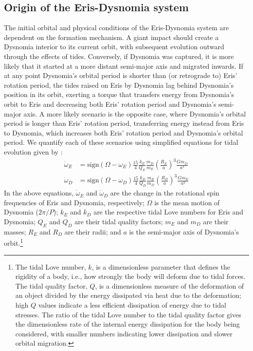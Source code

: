 \documentclass[onecolumn]{aastex631}
\begin{document}
\subsection{Origin of the Eris-Dysnomia system}
The initial orbital and physical conditions of the Eris-Dysnomia system are dependent on the formation mechanism. A giant impact should create a Dysnomia interior to its current orbit, with subsequent evolution outward through the effects of tides. Conversely, if Dysnomia was captured, it is more likely that it started at a more distant semi-major axis and migrated inwards. If at any point Dysnomia's orbital period is shorter than (or retrograde to) Eris' rotation period, the tides raised on Eris by Dysnomia lag behind Dysnomia's position in its orbit, exerting a torque that transfers energy from Dysnomia's orbit to Eris and decreasing both Eris' rotation period and Dysnomia's semi-major axis. A more likely scenario is the opposite case, where Dysnomia's orbital period is longer than Eris' rotation period, transferring energy instead from Eris to Dysnomia, which increases both Eris' rotation period and Dysnomia's orbital period.  We quantify each of these scenarios using simplified equations for tidal evolution given by \citet{Goldreich68}:
\begin{align}
\label{omegaE}
\dot{\omega}_E & =\mathrm{sign}(\Omega-\omega_E)\frac{15}{4}\frac{k_E}{Q_E}\frac{m_D}{m_E}\left(\frac{R_E}{a}\right)^3\frac{Gm_D}{a^3} \\
\dot{\omega}_D& =\mathrm{sign}(\Omega-\omega_D)\frac{15}{4}\frac{k_D}{Q_D}\frac{m_E}{m_D}\left(\frac{R_D}{a}\right)^3\frac{Gm_E}{a^3}
\label{omegaD}
\end{align}
In the above equations, $\dot{\omega}_E$ and $\dot{\omega}_D$ are the change in the rotational spin frequencies of Eris and Dysnomia, respectively; $\Omega$ is the mean motion of Dysnomia ($2\pi/P$); $k_E$ and $k_D$ are the respective tidal Love numbers for Eris and Dysnomia; $Q_E$  and $Q_D$ are their tidal quality factors; $m_E$ and $m_D$ are their masses; $R_E$ and $R_D$ are their radii; and $a$ is the semi-major axis of Dysnomia's orbit.\footnote{The tidal Love number, $k$, is a dimensionless parameter that defines the rigidity of a body, i.e., how strongly the body will deform due to tidal forces. The tidal quality factor, $Q$, is a dimensionless measure of the deformation of an object divided by the energy dissipated via heat due to the deformation; high $Q$ values indicate a less efficient dissipation of energy due to tidal stresses. The ratio of the tidal Love number to the tidal quality factor gives the dimensionless rate of the internal energy dissipation for the body being considered, with smaller numbers indicating lower dissipation and slower orbital migration.}
\end{document}
